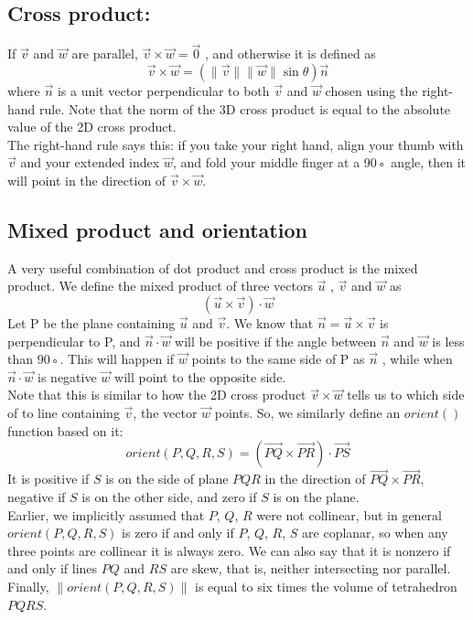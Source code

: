 	\subsection{Cross product:}
	If $\vec{v}$ and $\vec{w}$
	are parallel, $\vec{v} \times \vec{w} =
	\vec{0}$ , and otherwise it is defined as
	\[
		\vec{v} \times \vec{w} = (\lVert \vec{v} \rVert \lVert \vec{w} \rVert \sin \theta) \vec{n}
	\]
	where $\vec{n}$ is a unit vector perpendicular to both $\vec{v}$
	and $\vec{w}$ chosen using the right-hand rule. Note that the norm of the 3D cross
	product is equal to the absolute value of the 2D cross product. \\
	The right-hand rule says this: if you take your right hand, align your
	thumb with $\vec{v}$ and your extended index $\vec{w}$, and fold your middle finger at
	a 90◦ angle, then it will point in the direction of $\vec{v} \times \vec{w}$. 

	\subsection{Mixed product and orientation}
	A very useful combination of dot product and cross product is the mixed
	product. We define the mixed product of three vectors $\vec{u}$ , $\vec{v}$ and $\vec{w}$ as
	\[
		(\vec{u} \times \vec{v}) \cdot \vec{w}
	\]
	Let P be the plane containing $\vec{u}$ and $\vec{v}$. We know that $\vec{n} = \vec{u} \times \vec{v}$ is perpendicular to P, and $\vec{n} \cdot \vec{w}$ will be positive if the angle between $\vec{n}$ and $\vec{w}$ is less than 90◦. This will happen if $\vec{w}$ points to the same side of P as $\vec{n}$ ,
	while when $\vec{n} \cdot \vec{w}$ is negative $\vec{w}$ will point to the opposite side. \\
	Note that this is similar to how the 2D cross product $\vec{v} \times \vec{w}$ tells us to
	which side of to line containing  $\vec{v}$, the vector $\vec{w}$ points. So, we similarly define
	an $orient()$ function based on it:
	\[
		orient(P, Q, R, S) = (\vec{PQ} \times \vec{PR}) \cdot \vec{PS}
	\]
	It is positive if $S$ is on the side of plane $PQR$ in the direction of $\vec{PQ} \times \vec{PR}$,
	negative if $S$ is on the other side, and zero if $S$ is on the plane. \\
	Earlier, we implicitly assumed that $P$, $Q$, $R$ were not collinear, but in
	general $orient(P, Q, R, S)$ is zero if and only if $P$, $Q$, $R$, $S$ are coplanar, so
	when any three points are collinear it is always zero. We can also say that
	it is nonzero if and only if lines $PQ$ and $RS$ are skew, that is, neither
	intersecting nor parallel.
	Finally, $\lVert orient(P, Q, R, S) \rVert$ is equal to six times the volume of tetrahedron $PQRS$.


